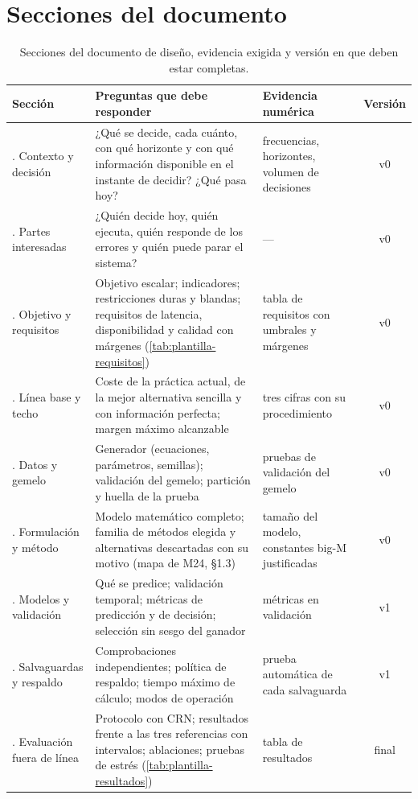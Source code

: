 \section{Secciones del documento}

\begin{table}[H]
\centering\footnotesize
\caption{Secciones del documento de diseño, evidencia exigida y versión en que deben estar completas.}\label{tab:plantilla-secciones}
\begin{tabularx}{\textwidth}{@{}>{\raggedright\arraybackslash}p{2.6cm}>{\raggedright\arraybackslash}X>{\raggedright\arraybackslash}p{3.6cm}c@{}}
\toprule
Sección & Preguntas que debe responder & Evidencia numérica & Versión \\
\midrule
1. Contexto y decisión & ¿Qué se decide, cada cuánto, con qué horizonte y con qué información disponible en el instante de decidir? ¿Qué pasa hoy? & frecuencias, horizontes, volumen de decisiones & v0 \\
2. Partes interesadas & ¿Quién decide hoy, quién ejecuta, quién responde de los errores y quién puede parar el sistema? & --- & v0 \\
3. Objetivo y requisitos & Objetivo escalar; indicadores; restricciones duras y blandas; requisitos de latencia, disponibilidad y calidad con márgenes (\cref{tab:plantilla-requisitos}) & tabla de requisitos con umbrales y márgenes & v0 \\
4. Línea base y techo & Coste de la práctica actual, de la mejor alternativa sencilla y con información perfecta; margen máximo alcanzable & tres cifras con su procedimiento & v0 \\
5. Datos y gemelo & Generador (ecuaciones, parámetros, semillas); validación del gemelo; partición y huella de la prueba & pruebas de validación del gemelo & v0 \\
6. Formulación y método & Modelo matemático completo; familia de métodos elegida y alternativas descartadas con su motivo (mapa de M24, §1.3) & tamaño del modelo, constantes big-M justificadas & v0 \\
7. Modelos y validación & Qué se predice; validación temporal; métricas de predicción y de decisión; selección sin sesgo del ganador & métricas en validación & v1 \\
8. Salvaguardas y respaldo & Comprobaciones independientes; política de respaldo; tiempo máximo de cálculo; modos de operación & prueba automática de cada salvaguarda & v1 \\
9. Evaluación fuera de línea & Protocolo con CRN; resultados frente a las tres referencias con intervalos; ablaciones; pruebas de estrés (\cref{tab:plantilla-resultados}) & tabla de resultados & final \\

\end{tabularx}
\end{table}

